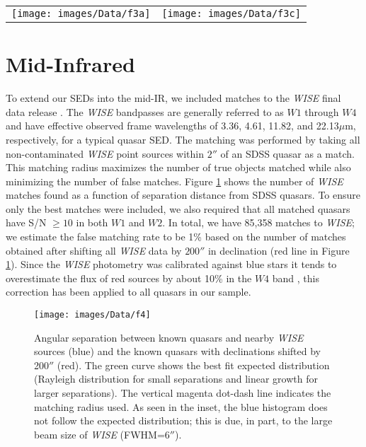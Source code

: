 \begin{figure*}[h]
 \centering
 \begin{tabular}{cc}
 \texttt{[image: images/Data/f3a]} & \texttt{[image: images/Data/f3c]}
 \end{tabular}
 
 \caption[2MASS vs. UKIDSS]{Contour-scatter plot showing the difference between the 2MASS and UKIDSS magnitudes vs. the UKIDSS magnitudes for the $J$ and $K$ filters. The blue contours/dots show the catalog 2MASS values, green shows the 2MASS $2\sigma$ extraction values with a detection in only one band, and red shows the rest of the extracted values. The blue dashed line shows the 2MASS point source catalog's limiting magnitude.
 The two surveys contain 12,130 quasars in common.  Green points were excluded as the errors are quite large (see text).  Similar results were found for the $H$ filter.}
 \label{2mass_v_ukidss}
\end{figure*}

\section{Mid-Infrared}

To extend our SEDs into the mid-IR, we included matches to the {\em WISE} final data release \citep{Wright:2010}.  The {\em WISE} bandpasses are generally referred to as $W1$ through $W4$ and have effective observed frame wavelengths of  3.36, 4.61, 11.82, and 22.13$\mu$m, respectively, for a typical quasar SED.  The matching was performed by taking all non-contaminated {\em WISE} point sources within $2''$ of an SDSS quasar as a match. This matching radius maximizes the number of true objects matched while also minimizing the number of false matches. Figure \ref{wise_sep} shows the number of {\em WISE} matches found as a function of separation distance from SDSS quasars. To ensure only the best matches were included, we also required that all matched quasars have S/N $\geq 10$ in both $W1$ and $W2$. In total, we have 85,358 matches to {\em WISE}; 
we estimate the false matching rate to be 1\% based on the number of matches obtained after shifting all {\em WISE} data by $200''$ in declination (red line in Figure \ref{wise_sep}). 
Since the {\em WISE} photometry was calibrated against blue stars it tends to overestimate the flux of red sources by about 10\% in the $W4$ band \citep{Wright:2010}, this correction has been applied to all quasars in our sample.

\begin{figure}[t]
 \centering
 \texttt{[image: images/Data/f4]}
 \caption[{\em WISE} matching radius]{Angular separation between known quasars and nearby {\em WISE} sources (blue) and the known quasars with declinations shifted by 200$''$ (red).   The green curve shows the best fit expected distribution (Rayleigh distribution for small separations and linear growth for larger separations). The vertical magenta dot-dash line indicates the matching radius used.  As seen in the inset, the blue histogram does not follow the expected distribution; this is due, in part, to the large beam size of {\em WISE} (FWHM=$6''$).}
 \label{wise_sep}
\end{figure}

